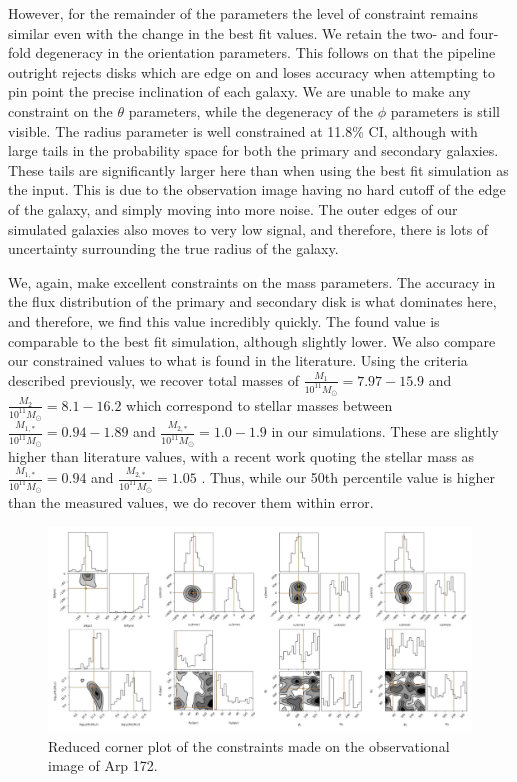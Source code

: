 However, for the remainder of the parameters the level of constraint remains similar even with the change in the best fit values. We retain the two- and four-fold degeneracy in the orientation parameters. This follows on that the pipeline outright rejects disks which are edge on and loses accuracy when attempting to pin point the precise inclination of each galaxy. We are unable to make any constraint on the $\theta$ parameters, while the degeneracy of the $\phi$ parameters is still visible. The radius parameter is well constrained at 11.8\% CI, although with large tails in the probability space for both the primary and secondary galaxies. These tails are significantly larger here than when using the best fit simulation as the input. This is due to the observation image having no hard cutoff of the edge of the galaxy, and simply moving into more noise. The outer edges of our simulated galaxies also moves to very low signal, and therefore, there is lots of uncertainty surrounding the true radius of the galaxy. 

We, again, make excellent constraints on the mass parameters. The accuracy in the flux distribution of the primary and secondary disk is what dominates here, and therefore, we find this value incredibly quickly. The found value is comparable to the best fit simulation, although slightly lower. We also compare our constrained values to what is found in the literature. Using the criteria described previously, we recover total masses of $\frac{M_{1}}{10^{11}M_{\odot}} = 7.97 - 15.9$ and $\frac{M_{2}}{10^{11}M_{\odot}} = 8.1 - 16.2$ which correspond to stellar masses between $\frac{M_{1,*}}{10^{11}M_{\odot}} = 0.94 - 1.89$ and $\frac{M_{2, *}}{10^{11}M_{\odot}} = 1.0 - 1.9$ in our simulations. These are slightly higher than literature values, with a recent work quoting the stellar mass as $\frac{M_{1, *}}{10^{11}M_{\odot}} = 0.94 $ and $\frac{M_{2, *}}{10^{11}M_{\odot}} = 1.05$ \citep{2020MNRAS.496.5243H}. Thus, while our 50th percentile value is higher than the measured values, we do recover them within error.

\begin{figure}
\centering
\includegraphics[width=\textwidth]{Chapter1/figures/Arp172-obs-red-corner.pdf}
\caption[Reduced corner plot of the constraints made on the observational image of Arp 172.]{Reduced corner plot of the constraints made on the observational image of Arp 172.}
\label{fig:Arp172-obs}
\end{figure}

